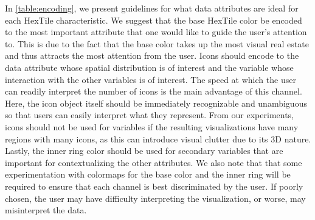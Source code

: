 In \cref{table:encoding}, we present guidelines for what data attributes are ideal for each HexTile characteristic. 
%
We suggest that the base HexTile color be encoded to the most important attribute that one would like to guide the user's attention to. 
%
This is due to the fact that the base color takes up the most visual real estate and thus attracts the most attention from the user.
%
Icons should encode to the data attribute whose spatial distribution is of interest and the variable whose interaction with the other variables is of interest.
%
The speed at which the user can readily interpret the number of icons is the main advantage of this channel.
%
Here, the icon object itself should be immediately recognizable and unambiguous so that users can easily interpret what they represent. 
%
From our experiments, icons should not be used for variables if the resulting visualizations have many regions with many icons, as this can introduce visual clutter due to its 3D nature.
%
Lastly, the inner ring color should be used for secondary variables that are important for contextualizing the other attributes.
%
We also note that that some experimentation with colormaps for the base color and the inner ring will be required to ensure that each channel is best discriminated by the user.
%
If poorly chosen, the user may have difficulty interpreting the visualization, or worse, may misinterpret the data.



